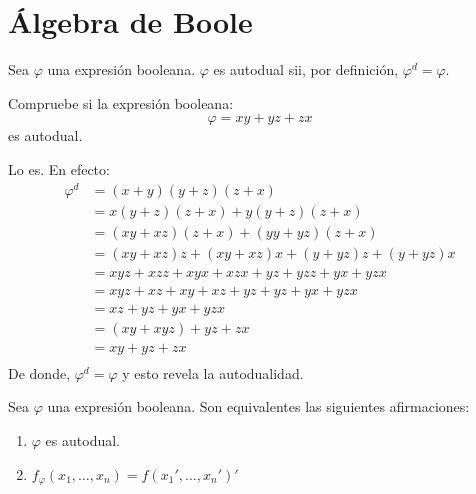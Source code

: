 \section{Álgebra de Boole}


\begin{definition}
  Sea $\varphi$ una expresión booleana. $\varphi$ es autodual sii, por
  definición, $\varphi^{d}=\varphi$.
\end{definition}

\begin{exercise}
  Compruebe si la expresión booleana:
  \begin{equation*}
    \varphi=xy+yz+zx
  \end{equation*}
  es autodual.
\end{exercise}

\begin{solution}
  Lo es. En efecto:
  \begin{align*}
    \varphi^{d}&=(x+y)(y+z)(z+x)\\
               &=x(y+z)(z+x)+y(y+z)(z+x)\\
               &=(xy+xz)(z+x)+(yy+yz)(z+x)\\
               &=(xy+xz)z+(xy+xz)x+(y+yz)z+(y+yz)x\\
               &=xyz+xzz+xyx+xzx+yz+yzz+yx+yzx\\
               &=xyz+xz+xy+xz+yz+yz+yx+yzx\\
               &=xz+yz+yx+yzx\\
               &=(xy+xyz)+yz+zx\\
               &=xy+yz+zx\\
  \end{align*}
  De donde, $\varphi^{d}=\varphi$ y esto revela la autodualidad.
\end{solution}

\begin{theorem}
  Sea $\varphi$ una expresión booleana. Son equivalentes las
  siguientes afirmaciones:
  \begin{enumerate}
  \item $\varphi$ es autodual.
  \item $f_{\varphi}(x_{1},\ldots,x_{n})=f(x_{1}',\ldots,x_{n}')'$
  \end{enumerate}
\end{theorem}


